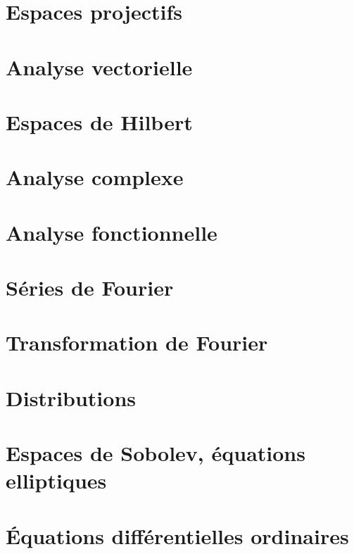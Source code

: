 \documentclass[a4paper,twoside,11pt]{book}
\begin{document}
\chapter{Espaces projectifs}




\chapter{Analyse vectorielle}


\chapter{Espaces de Hilbert}


\chapter{Analyse complexe}          \label{ChapICHIooXbLccl}



\chapter{Analyse fonctionnelle}



\chapter{Séries de Fourier}


\chapter{Transformation de Fourier}


\chapter{Distributions}


\chapter{Espaces de Sobolev, équations elliptiques}      \label{CHAPooVTIIooGOEvXT}


\chapter{Équations différentielles ordinaires}




\end{document}
